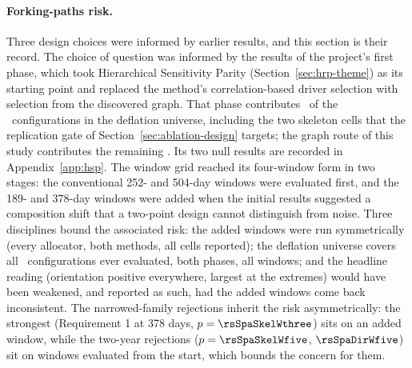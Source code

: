 \paragraph{Forking-paths risk.} Three design choices were informed by
earlier results, and this section is their record. The choice of question
was informed by the results of the project's first phase, which took
Hierarchical Sensitivity Parity \cite{rodriguez2023hsp}
(Section~\ref{sec:hrp-theme}) as its starting point and replaced the
method's correlation-based driver selection with selection from the
discovered graph. That phase contributes \rsNtrialsPhaseI\ of the
\rsNtrials\ configurations in the deflation universe, including the two
skeleton cells that the replication gate of
Section~\ref{sec:ablation-design} targets; the graph route of this study
contributes the remaining \rsNtrialsPhaseII. Its two null results are
recorded in Appendix~\ref{app:hsp}. The window grid reached its
four-window form in two stages: the conventional 252- and 504-day windows
were evaluated first, and the 189- and 378-day windows were added when the
initial results suggested a composition shift that a two-point design
cannot distinguish from noise. Three disciplines bound the associated
risk: the added windows were run symmetrically (every allocator, both
methods, all cells reported); the deflation universe covers all
\rsNtrials\ configurations ever evaluated, both phases, all windows; and
the headline reading (orientation positive everywhere, largest at the
extremes) would have been weakened, and reported as such, had the added
windows come back inconsistent. The narrowed-family rejections inherit
the risk asymmetrically: the strongest (Requirement 1 at 378 days,
$p=\rsSpaSkelWthree$)
sits on an added window, while the two-year rejections
($p=\rsSpaSkelWfive$, $\rsSpaDirWfive$) sit on windows evaluated from the
start, which bounds the concern for them.

